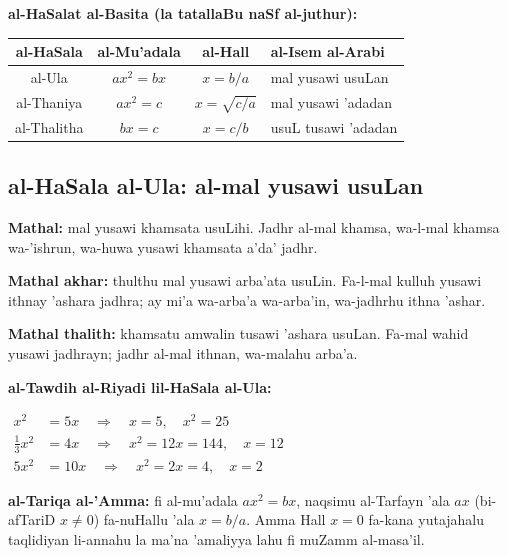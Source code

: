 \documentclass[11pt,a4paper]{book}
\begin{document}
\begin{mathexplain}
\textbf{al-HaSalat al-Basita (la tatallaBu naSf al-juthur):}

\begin{center}
\begin{tabular}{|c|c|c|l|}
\hline
\textbf{al-HaSala} & \textbf{al-Mu'adala} & \textbf{al-Hall} & \textbf{al-Isem al-Arabi} \\
\hline
al-Ula & $ax^2 = bx$ & $x = b/a$ & mal yusawi usuLan \\
\hline
al-Thaniya & $ax^2 = c$ & $x = \sqrt{c/a}$ & mal yusawi 'adadan \\
\hline
al-Thalitha & $bx = c$ & $x = c/b$ & usuL tusawi 'adadan \\
\hline
\end{tabular}
\end{center}
\end{mathexplain}

\subsection{al-HaSala al-Ula: al-mal yusawi usuLan}

\begin{originaltext}
\textbf{Mathal:} mal yusawi khamsata usuLihi. Jadhr al-mal khamsa,
wa-l-mal khamsa wa-'ishrun, wa-huwa yusawi khamsata a'da' jadhr.

\textbf{Mathal akhar:} thulthu mal yusawi arba'ata usuLin. Fa-l-mal
kulluh yusawi ithnay 'ashara jadhra; ay mi'a wa-arba'a wa-arba'in,
wa-jadhrhu ithna 'ashar.

\textbf{Mathal thalith:} khamsatu amwalin tusawi 'ashara usuLan.
Fa-mal wahid yusawi jadhrayn; jadhr al-mal ithnan, wa-malahu
arba'a.
\end{originaltext}

\begin{mathexplain}
\textbf{al-Tawdih al-Riyadi lil-HaSala al-Ula:}

\begin{center}
$\begin{aligned}
  x^2 &= 5x \quad\Rightarrow\quad x = 5, \quad x^2 = 25 \\
  \tfrac{1}{3}x^2 &= 4x \quad\Rightarrow\quad x^2 = 12x = 144, \quad x = 12 \\
  5x^2 &= 10x \quad\Rightarrow\quad x^2 = 2x = 4, \quad x = 2
\end{aligned}$
\end{center}

\textbf{al-Tariqa al-'Amma:} fi al-mu'adala $ax^2 = bx$, naqsimu
al-Tarfayn 'ala $ax$ (bi-afTariD $x \neq 0$) fa-nuHallu 'ala
$x = b/a$. Amma Hall $x = 0$ fa-kana yutajahalu taqlidiyan li-annahu
la ma'na 'amaliyya lahu fi muZamm al-masa'il.
\end{mathexplain}
\end{document}
